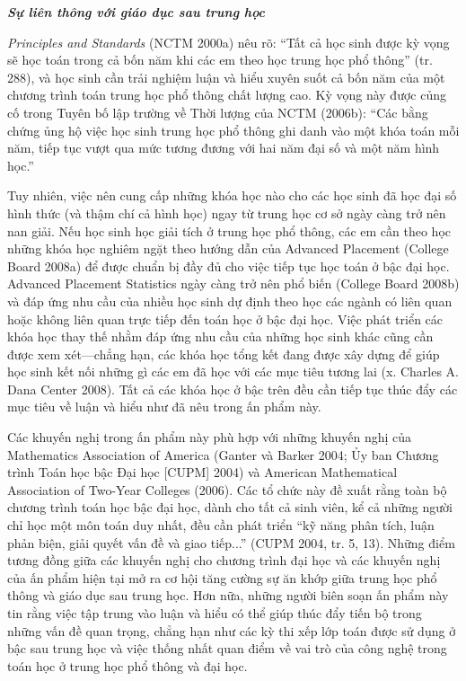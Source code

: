 \documentclass[
  10pt,
  a4paper,
  landscape,
  twoside,
  openany
]{scrbook}
\newcommand{\VI}[1]{#1}
\newcommand{\NOTE}[1]{#1}
\begin{document}
{
\VI{
\noindent
\textbf{\emph{Sự liên thông với giáo dục sau trung học}}

\emph{Principles and Standards} (NCTM 2000a) nêu rõ: ``Tất cả học sinh được kỳ vọng sẽ học toán trong cả bốn năm khi các em theo học trung học phổ thông” (tr. 288), và học sinh cần trải nghiệm luận và hiểu xuyên suốt cả bốn năm của một chương trình toán trung học phổ thông chất lượng cao. Kỳ vọng này được củng cố trong Tuyên bố lập trường về Thời lượng của NCTM (2006b): “Các bằng chứng ủng hộ việc học sinh trung học phổ thông ghi danh vào một khóa toán mỗi năm, tiếp tục vượt qua mức tương đương với hai năm đại số và một năm hình học.''

Tuy nhiên, việc nên cung cấp những khóa học nào cho các học sinh đã học đại số hình thức (và thậm chí cả hình học) ngay từ trung học cơ sở ngày càng trở nên nan giải. Nếu học sinh học giải tích ở trung học phổ thông, các em cần theo học những khóa học nghiêm ngặt theo hướng dẫn của Advanced Placement (College Board 2008a) để được chuẩn bị đầy đủ cho việc tiếp tục học toán ở bậc đại học. Advanced Placement Statistics ngày càng trở nên phổ biến (College Board 2008b) và đáp ứng nhu cầu của nhiều học sinh dự định theo học các ngành có liên quan hoặc không liên quan trực tiếp đến toán học ở bậc đại học. Việc phát triển các khóa học thay thế nhằm đáp ứng nhu cầu của những học sinh khác cũng cần được xem xét---chẳng hạn, các khóa học tổng kết đang được xây dựng để giúp học sinh kết nối những gì các em đã học với các mục tiêu tương lai (x. Charles A. Dana Center 2008). Tất cả các khóa học ở bậc trên đều cần tiếp tục thúc đẩy các mục tiêu về luận và hiểu như đã nêu trong ấn phẩm này.

Các khuyến nghị trong ấn phẩm này phù hợp với những khuyến nghị của Mathematics Association of America (Ganter và Barker 2004; Ủy ban Chương trình Toán học bậc Đại học [CUPM] 2004) và American Mathematical Association of Two-Year Colleges (2006). Các tổ chức này đề xuất rằng toàn bộ chương trình toán học bậc đại học, dành cho tất cả sinh viên, kể cả những người chỉ học một môn toán duy nhất, đều cần phát triển ``kỹ năng phân tích, luận phản biện, giải quyết vấn đề và giao tiếp...'' (CUPM 2004, tr. 5, 13). Những điểm tương đồng giữa các khuyến nghị cho chương trình đại học và các khuyến nghị của ấn phẩm hiện tại mở ra cơ hội tăng cường sự ăn khớp giữa trung học phổ thông và giáo dục sau trung học. Hơn nữa, những người biên soạn ấn phẩm này tin rằng việc tập trung vào luận và hiểu có thể giúp thúc đẩy tiến bộ trong những vấn đề quan trọng, chẳng hạn như các kỳ thi xếp lớp toán được sử dụng ở bậc sau trung học và việc thống nhất quan điểm về vai trò của công nghệ trong toán học ở trung học phổ thông và đại học.}
}
{
\NOTE{}
}
\end{document}

